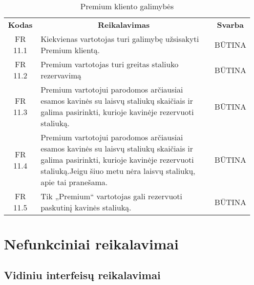 \documentclass{VUMIFPSkursinis}
\begin{document}
\begin{center}
	\begin{table}[H]
	\begin{tabular}{|p{2cm}|p{}|p{}|}
	\hline
	    \rowcolor{lightgray}
		\multicolumn{3}{|c|}{Premium kliento galimybės}\\
		
	\hline
		\multicolumn{1}{|c|}{{\bfseries Kodas}}&
		\multicolumn{1}{|c|}{{\bfseries Reikalavimas}}&
		\multicolumn{1}{|c|}{{\bfseries Svarba}}\\
	\hline 	
		\multicolumn{1}{|c|}{FR 11.1}&
		{Kiekvienas vartotojas turi galimybę užsisakyti Premium klientą.}&
		\multicolumn{1}{|c|}{BŪTINA}\\
				
	\hline 	
		\multicolumn{1}{|c|}{FR 11.2}&
		{Premium vartotojas turi greitas staliuko rezervavimą}&
		\multicolumn{1}{|c|}{BŪTINA}\\
				
	\hline 	
		\multicolumn{1}{|c|}{FR 11.3}&
		{Premium vartotojui parodomos arčiausiai esamos kavinės su laisvų staliukų skaičiais ir galima pasirinkti, kurioje kavinėje rezervuoti staliuką.}&
		\multicolumn{1}{|c|}{BŪTINA}\\
				
	\hline 	
		\multicolumn{1}{|c|}{FR 11.4}&
		{Premium vartotojui parodomos arčiausiai esamos kavinės su laisvų staliukų skaičiais ir galima pasirinkti, kurioje kavinėje rezervuoti staliuką.Jeigu šiuo metu nėra laisvų staliukų, apie tai pranešama.}&
		\multicolumn{1}{|c|}{BŪTINA}\\
				
	\hline 	
		\multicolumn{1}{|c|}{FR 11.5}&
		{Tik „Premium“ vartotojas gali rezervuoti paskutinį kavinės staliuką.}&
		\multicolumn{1}{|c|}{BŪTINA}\\
				
	\hline

	\end{tabular}
	\caption{Premium kliento galimybės}
	\label{table:Premiumklientogalimybės}		
	\end{table}

\end{center}

\pagebreak
\section{Nefunkciniai reikalavimai}

\subsection{Vidiniu interfeisų reikalavimai}
\end{document}
